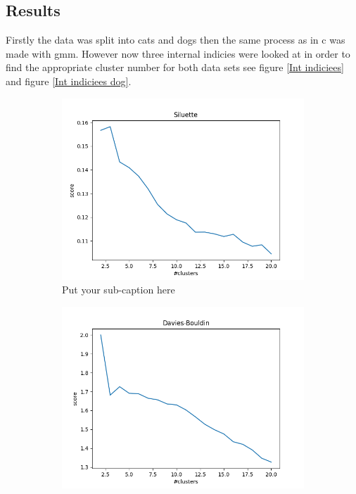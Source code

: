 \documentclass{article}
\begin{document}
\subsection{Results}
Firstly the data was split into cats and dogs then the same process as in c was made with gmm. However now three internal indicies were looked at in order to find the appropriate cluster number for both data sets see figure \ref{Int indiciees} and figure \ref{Int indiciees dog}. 
\begin{figure}[ht]
\begin{subfigure}{.33\textwidth}
  \centering
  \includegraphics[width=1\linewidth]{1d/Cats/siluette cats.png}  
  \caption{Put your sub-caption here}
  \label{fig:sub-first}
\end{subfigure}
\begin{subfigure}{.33\textwidth}
  \centering
  \includegraphics[width=1\linewidth]{1d/Cats/davies cats.png}  

\end{subfigure}
\end{figure}
\end{document}
